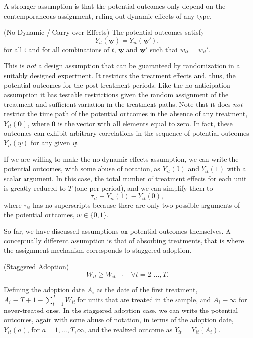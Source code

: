 \documentclass[letterpaper,12pt,leqno]{article}
\newcommand{\ubww}{\underline{\mathbf{w}}}
\begin{document}
A stronger assumption is that the potential outcomes only depend on the contemporaneous assignment, ruling out dynamic effects of any type.
\begin{assumption}{\sc (No Dynamic / Carry-over Effects)}
    The potential outcomes satisfy
\[Y_{it}(\ubww)=Y_{it}(\ubww'), \]
for all  $i$ and for all combinations of $t$, $\ubww$ and $\ubww'$ such that
$w_{it}=w_{it}'$.
\end{assumption}
This is \emph{not} a design assumption that can be guaranteed by randomization in a suitably designed experiment. It restricts the treatment effects and, thus, the potential outcomes for the post-treatment periods. Like the no-anticipation assumption it has testable restrictions given the random assignment of the treatment and sufficient variation in the treatment paths.
Note that it does \emph{not} restrict the time path of the potential outcomes in the absence of any treatment, $Y_{it}(\mathbf{0})$, where $\mathbf{0}$ is the vector with all elements equal to zero. In fact, these outcomes can exhibit arbitrary correlations in the sequence of potential outcomes $Y_{it}(\underline{w})$ for any given $\underline{w}$. 

If we are willing to make the no-dynamic effects assumption, we can write the potential outcomes, with some abuse of notation, as $Y_{it}(0)$ and $Y_{it}(1)$ with a scalar argument. In this case, the total number of treatment effects for each unit is greatly reduced to $T$ (one per period), and we can simplify them  to
\begin{equation}\label{eq:estimand_general_2}
\tau_{it} \equiv Y_{it}(1) - Y_{it}(0),
\end{equation}
where $\tau_{it}$ has no superscripts because there are only two possible arguments of the potential outcomes, $w\in\{0,1\}$.

So far, we have discussed assumptions on potential outcomes themselves. A conceptually different assumption is that of absorbing treatments, that is where the assignment mechanism corresponds to staggered adoption.
\begin{assumption}{\sc (Staggered Adoption)}
\[ W_{it}\geq W_{it-1}\quad\forall t=2,\ldots,T.\]    
\end{assumption}
Defining the adoption date $A_i$ as the date of the first treatment, $A_i\equiv T+1-\sum_{t=1}^T W_{it}$ for units that are treated in the sample, and $A_i \equiv \infty$ for never-treated ones.
In the staggered adoption case, we can write the potential outcomes, again with some abuse of notation, in terms of the adoption date, $Y_{it}(a)$, for $a=1,\ldots,T, \infty$, and the realized outcome as $Y_{it}=Y_{it}(A_i)$.
\end{document}
